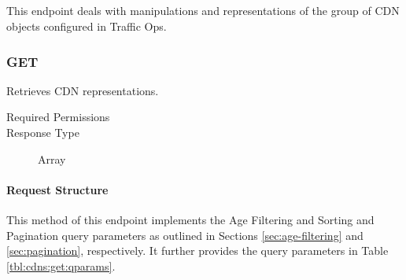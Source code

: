 %
%

\subsection{}
This endpoint deals with manipulations and representations of the group of CDN
objects configured in Traffic Ops.

\subsubsection{GET}
Retrieves CDN representations.
\begin{description}
	\item[Required Permissions] 
	\item[Response Type] Array
\end{description}

\paragraph{Request Structure}
This method of this endpoint implements the Age Filtering and Sorting and
Pagination query parameters as outlined in Sections \ref{sec:age-filtering} and
\ref{sec:pagination}, respectively. It further provides the query parameters in
Table \ref{tbl:cdns:get:qparams}.

